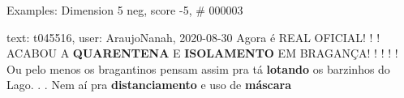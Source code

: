 \begin{frame}{Examples: Dimension 5 neg, score -5, \# 000003}
\footnotesize
\begin{alertblock}{text: t045516, user: AraujoNanah, 2020-08-30}
Agora é REAL OFICIAL! ! ! ACABOU A \textbf{QUARENTENA} E \textbf{ISOLAMENTO} EM 
BRAGANÇA! ! ! ! ! Ou pelo menos os bragantinos pensam assim pra tá 
\textbf{lotando} os barzinhos do Lago. . . Nem aí pra \textbf{distanciamento} e 
uso de \textbf{máscara} 
\end{alertblock}
\end{frame}
